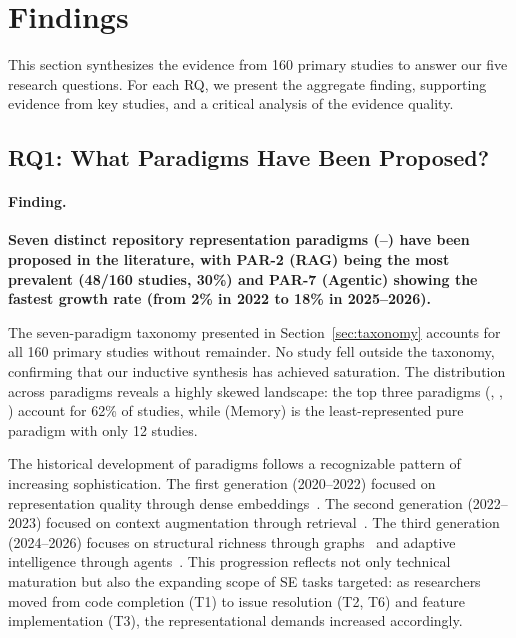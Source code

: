 \section{Findings}
\label{sec:findings}

This section synthesizes the evidence from 160 primary studies to answer our five research
questions. For each RQ, we present the aggregate finding, supporting evidence from key studies,
and a critical analysis of the evidence quality.

\subsection{RQ1: What Paradigms Have Been Proposed?}
\label{subsec:rq1}

\paragraph{Finding.}
\textbf{Seven distinct repository representation paradigms (--) have been
proposed in the literature, with PAR-2 (RAG) being the most prevalent (48/160 studies, 30\%)
and PAR-7 (Agentic) showing the fastest growth rate (from 2\% in 2022 to 18\% in 2025--2026).}

The seven-paradigm taxonomy presented in Section~\ref{sec:taxonomy} accounts for all 160
primary studies without remainder. No study fell outside the taxonomy, confirming that our
inductive synthesis has achieved saturation. The distribution across paradigms reveals a highly
skewed landscape: the top three paradigms (, , ) account for 62\%
of studies, while  (Memory) is the least-represented pure paradigm with only 12
studies.

The historical development of paradigms follows a recognizable pattern of increasing
sophistication. The first generation (2020--2022) focused on representation quality through
dense embeddings~\cite{feng2020codebert, guo2021graphcodebert, guo2022unixcoder}. The second
generation (2022--2023) focused on context augmentation through retrieval~\cite{zhang2023repocoder,
lu2022reacc, shrivastava2023repolevel}. The third generation (2024--2026) focuses on
structural richness through graphs~\cite{liu2024graphcoder, ouyang2025repograph, tao2025cgm}
and adaptive intelligence through agents~\cite{yang2024sweagent, zhang2024autocoderover,
ma2025lingma}. This progression reflects not only technical maturation but also the expanding
scope of SE tasks targeted: as researchers moved from code completion (T1) to issue
resolution (T2, T6) and feature implementation (T3), the representational demands increased
accordingly.


